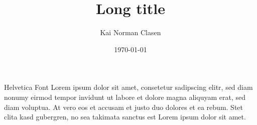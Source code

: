 \documentclass[aspectratio=169]{beamer}
\title[Helvetica Font]{Long title}
\author{Kai Norman Clasen}
\institute{}
\date{\today}
\begin{document}
  \begin{frame}{Helvetica Font}
    Lorem ipsum dolor sit amet, consetetur sadipscing elitr, 
    sed diam nonumy eirmod tempor invidunt ut labore et dolore 
    magna aliquyam erat, sed diam voluptua. 
    At vero eos et accusam et justo duo dolores et ea rebum. 
    Stet clita kasd gubergren, no sea takimata sanctus est 
    Lorem ipsum dolor sit amet.
  \end{frame}
\end{document}
